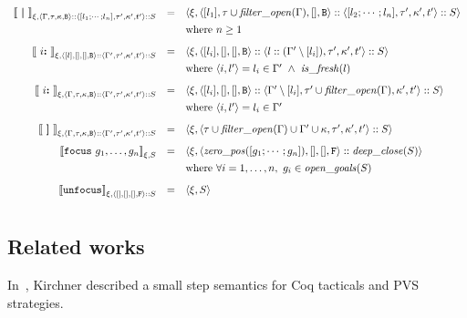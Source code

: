 \[\begin{array}{rcl}
 |[~\mbox{\textbf{\textbar}}~|]_{{\xi},{\langle\Gamma,\tau,\kappa,\mathtt{B}\rangle::\langle[l_{1};\cdots;l_n],\tau',\kappa',t'\rangle
  ::S}}
 & =
 & \langle
   \xi, \langle[l_1],\tau\cup\mathit{filter\_open}(\Gamma),[],\mathtt{B}\rangle
	::\langle[l_{2};\cdots;l_n],\tau',\kappa',t'\rangle::S
   \rangle
 \\[1ex]
 & & \mathrm{where} ~ n\geq 1
 \\[2ex]

 |[~i\mbox{\textbf{:}}~|]_{{\xi},{\langle[l],[],[],\mathtt{B}\rangle::\langle\Gamma',\tau',\kappa',t'\rangle::S}}
 & =
 & \langle \xi, \langle[l_i],[],[],\mathtt{B}\rangle
   ::\langle l :: (\Gamma'\setminus [l_i]),\tau',\kappa',t'\rangle::S \rangle
 \\[1ex]
 & & \mathrm{where} ~ \langle i,l'\rangle = l_i\in \Gamma'~\land~\mathit{is\_fresh}(l)
 \\[2ex]

 |[~i\mbox{\textbf{:}}~|]_{{\xi},{\langle\Gamma,\tau,\kappa,\mathtt{B}\rangle
  ::\langle\Gamma',\tau',\kappa',t'\rangle::S}}
 & =
 & \langle \xi, \langle[l_i],[],[],\mathtt{B}\rangle
 ::\langle\Gamma'\setminus [l_i],\tau'\cup\mathit{filter\_open}(\Gamma),\kappa',t'\rangle::S
   \rangle
 \\[1ex]
 & & \mathrm{where} ~ \langle i, l'\rangle = l_i\in \Gamma'
 \\[2ex]

 |[~\mbox{\textbf{]}}~|]_{{\xi},{\langle\Gamma,\tau,\kappa,\mathtt{B}\rangle::\langle\Gamma',\tau',\kappa',t'\rangle
  ::S}}
 & =
 & \langle \xi,
   \langle\tau\cup\mathit{filter\_open}(\Gamma)\cup\Gamma'\cup\kappa,\tau',\kappa',t'\rangle
   :: S
   \rangle
 \\[2ex]

 |[\mathtt{focus}~g_1,\dots,g_n|]_{{\xi},{S}}
 & = 
 & \langle \xi, \langle\mathit{zero\_pos}([g_1;\cdots;g_n]),[],[],\mathtt{F}\rangle
   ::\mathit{deep\_close}(S)
   \rangle
 \\[1ex]
 & & \mathrm{where} ~
 \forall i=1,\dots,n,~g_i\in\mathit{open\_goals}(S)
 \\[2ex]

 |[\mathtt{unfocus}|]_{{\xi},{\langle[],[],[],\mathtt{F}\rangle::S}}
 & = 
 & \langle \xi, S\rangle \\[2ex]

\end{array}
\]

\subsection{Related works}

In~\cite{fk:strata2003}, Kirchner described a small step semantics for Coq
tacticals and PVS strategies.

